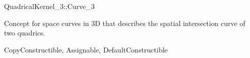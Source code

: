 
\begin{ccRefConcept}{QuadricalKernel_3::Curve_3}

Concept for space curves in 3D that describes the spatial intersection curve
of two quadrics.

\ccRefines
CopyConstructible, Assignable, DefaultConstructible

\ccHasModels
{}
\end{ccRefConcept}
